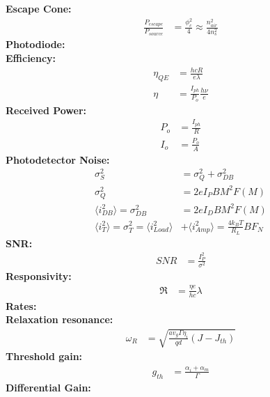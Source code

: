\documentclass[landscape,a4paper,8pt]{article}
\begin{document}
\begin{multicols}{4}
	\hspace{3mm}\textbf{Escape Cone:}
	\begin{align}
		\frac{P_{escape}}{P_{source}} &= \frac{\phi_c^2}{4} \approx \frac{n_{air}^2}{4n_s^2}
	\end{align}
	\textbf{Photodiode:}\\
	\hspace{3mm}\textbf{Efficiency:}
	\begin{align}
		\eta_{QE} &= \frac{hcR}{e\lambda}\\
		\eta &= \frac{I_{ph}}{P_o} \frac{h\nu}{e}
	\end{align}
	\hspace{3mm}\textbf{Received Power:}
	\begin{align}
		P_o &= \frac{I_{ph}}{R}\\
		I_o &= \frac{P_o}{A}
	\end{align}
	\hspace{3mm}\textbf{Photodetector Noise:}
	\begin{align}
		\sigma_S^2 &= \sigma_Q^2 + \sigma_{DB}^2\\
		\sigma_Q^2 &= 2eI_P BM^2 F(M)\\
		\langle i_{DB}^2 \rangle = \sigma_{DB}^2 &= 2eI_D BM^2 F(M)\\
		\langle i_T^2 \rangle = \sigma_T^2 = \langle i_{Load}^2 \rangle &+ \langle i_{Amp}^2 \rangle = \frac{4k_B T}{R_L}BF_N
	\end{align}
	\hspace{3mm}\textbf{SNR:}
	\begin{align}
		SNR &= \frac{I_P^2}{\sigma^2}
	\end{align}
	\hspace{3mm}\textbf{Responsivity:}
	\begin{align}
		\mathfrak{R} &= \frac{\eta e}{hc}\lambda
	\end{align}
	\textbf{Rates:}\\
	\hspace{3mm}\textbf{Relaxation resonance:}
	\begin{align}
		\omega_R &= \sqrt{\frac{a v_g \Gamma \eta_i}{qd} (J-J_{th})}
	\end{align}
	\hspace{3mm}\textbf{Threshold gain:}
	\begin{align}
		g_{th} &= \frac{\alpha_i + \alpha_m}{\Gamma}
	\end{align}
	\hspace{3mm}\textbf{Differential Gain:}
	\begin{align}

\end{align}
\end{multicols}
\end{document}
